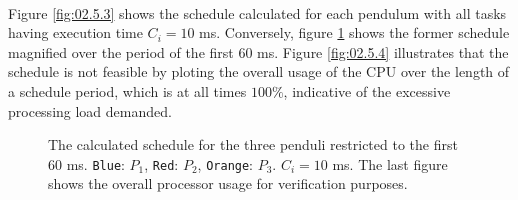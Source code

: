 \noindent{}\\


Figure \ref{fig:02.5.3} shows the schedule calculated for each pendulum with all
tasks having execution time $C_i = 10$ ms. Conversely, figure
\ref{fig:02.5.3.small} shows the former schedule magnified over the period of
the first 60 ms. Figure \ref{fig:02.5.4} illustrates that the schedule
is not feasible by ploting the overall usage of the CPU over the length of a
schedule period, which is at all times $100\%$, indicative of the excessive
processing load demanded.

\begin{sidewaysfigure}

  \begin{figure}[H]\centering
    \scalebox{1}{}
    \caption{The calculated schedule for the three penduli restricted to the first
      60 ms. \texttt{Blue}: $P_1$, \texttt{Red}: $P_2$,
      \texttt{Orange}: $P_3$. $C_i = 10$ ms. The last figure shows the overall
      processor usage for verification purposes.}
  \label{fig:02.5.3.small}
  \end{figure}

\end{sidewaysfigure}



